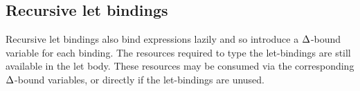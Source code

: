 \documentclass[acmsmall,review,screen]{acmart}
\newcommand{\ROUNDTWO}[1]{{\color{red}#1}}
\begin{document}
\subsection{Recursive let bindings}\label{sec:recursivelets}

%
Recursive let bindings also bind expressions lazily and so
introduce a $\Delta$-bound variable for each binding. \ROUNDTWO{The} resources required to type the
let-bindings are still available in the \ROUNDTWO{let body}. \ROUNDTWO{These
resources may} be consumed
via \ROUNDTWO{the corresponding} $\Delta$-bound variables, or directly if the let-bindings are unused.
%

%
%
%
%
\end{document}
